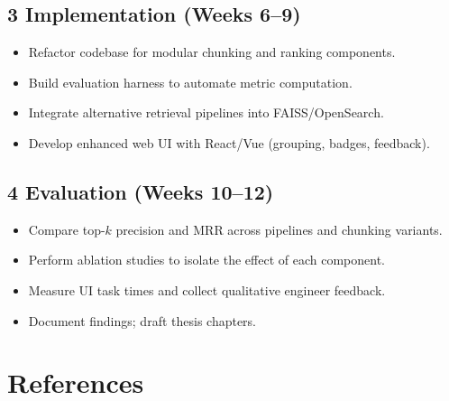 \documentclass[12pt,a4paper]{article}
\begin{document}
\subsection*{3 Implementation (Weeks 6–9)}
\begin{itemize}
  \item Refactor codebase for modular chunking and ranking components.
  \item Build evaluation harness to automate metric computation.
  \item Integrate alternative retrieval pipelines into FAISS/OpenSearch.
  \item Develop enhanced web UI with React/Vue (grouping, badges, feedback).
\end{itemize}

\subsection*{4 Evaluation (Weeks 10–12)}
\begin{itemize}
  \item Compare top-\(k\) precision and MRR across pipelines and chunking variants.
  \item Perform ablation studies to isolate the effect of each component.
  \item Measure UI task times and collect qualitative engineer feedback.
  \item Document findings; draft thesis chapters.
\end{itemize}

\section*{References}
\nocite{*}       
\printbibliography[heading=none] 
\end{document}
